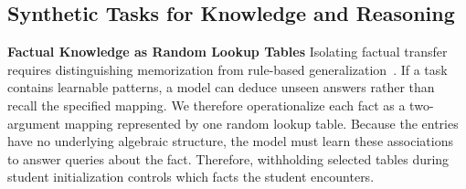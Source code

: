 \documentclass[]{template}
\theoremstyle{plain}
\theoremstyle{definition}
\theoremstyle{remark}
\renewcommand{\paragraph}[1]{\vspace{1mm}\noindent\textbf{#1}}
\begin{document}


\subsection{Synthetic Tasks for Knowledge and Reasoning}
\label{sec:synthetic_world}

\paragraph{Factual Knowledge as Random Lookup Tables}
Isolating factual transfer requires distinguishing memorization from rule-based generalization~\citep{morris2026how}. If a task contains learnable patterns, a model can deduce unseen answers rather than recall the specified mapping. We therefore operationalize each fact as a two-argument mapping represented by one random lookup table.  Because the entries have no underlying algebraic structure, the model must learn these associations to answer queries about the fact. Therefore, withholding selected tables during student initialization controls which facts the student encounters.
\end{document}
